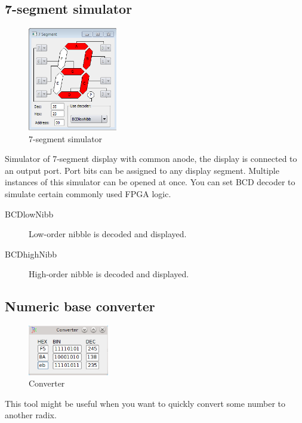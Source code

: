     \subsection{7-segment simulator}
        \begin{figure}
            \centering
            \includegraphics[width=110pt]{img/7seg_sim.png}
            \caption{7-segment simulator}
        \end{figure}
        Simulator of 7-segment display with common anode, the display is connected to an output port. Port bits can be
        assigned to any display segment. Multiple instances of this simulator can be opened at once. You can set BCD decoder to simulate certain commonly used FPGA logic.

        \begin{description}
            \item[BCDlowNibb] Low-order nibble is decoded and displayed.
            \item[BCDhighNibb] High-order nibble is decoded and displayed.
        \end{description}

    \subsection{Numeric base converter}
        \begin{figure}
            \centering
            \includegraphics[width=100pt]{img/converter.png}
            \caption{Converter}
        \end{figure}
        This tool might be useful when you want to quickly convert some number to another radix.
